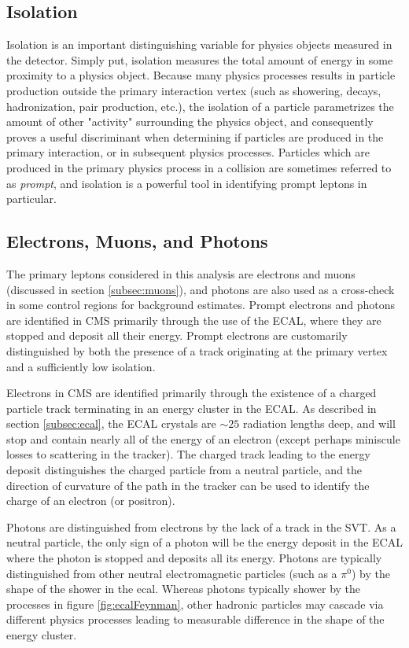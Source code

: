 \subsection{Isolation}
\label{subsec:iso}
Isolation is an important distinguishing variable for physics objects measured in the detector. Simply put, isolation measures the total amount of energy in some proximity to a physics object. Because many physics processes results in particle production outside the primary interaction vertex (such as showering, decays, hadronization, pair production, etc.), the isolation of a particle parametrizes the amount of other "activity" surrounding the physics object, and consequently proves a useful discriminant when determining if particles are produced in the primary interaction, or in subsequent physics processes. Particles which are produced in the primary physics process in a collision are sometimes referred to as {\it prompt}, and isolation is a powerful tool in identifying prompt leptons in particular.

\subsection{Electrons, Muons, and Photons}
\label{subsec:lepgamme}
The primary leptons considered in this analysis are electrons and muons (discussed in section \ref{subsec:muons}), and photons are also used as a cross-check in some control regions for background estimates. Prompt electrons and photons are identified in CMS primarily through the use of the ECAL, where they are stopped and deposit all their energy. Prompt electrons are customarily distinguished by both the presence of a track originating at the primary vertex and a sufficiently low isolation.

Electrons in CMS are identified primarily through the existence of a charged particle track terminating in an energy cluster in the ECAL. As described in section \ref{subsec:ecal}, the ECAL crystals are $\sim25$ radiation lengths deep, and will stop and contain nearly all of the energy of an electron (except perhaps miniscule losses to scattering in the tracker). The charged track leading to the energy deposit distinguishes the charged particle from a neutral particle, and the direction of curvature of the path in the tracker can be used to identify the charge of an electron (or positron).

Photons are distinguished from electrons by the lack of a track in the SVT. As a neutral particle, the only sign of a photon will be the energy deposit in the ECAL where the photon is stopped and deposits all its energy. Photons are typically distinguished from other neutral electromagnetic particles (such as a $\pi^0$) by the shape of the shower in the ecal. Whereas photons typically shower by the processes in figure \ref{fig:ecalFeynman}, other hadronic particles may cascade via different physics processes leading to measurable difference in the shape of the energy cluster.

